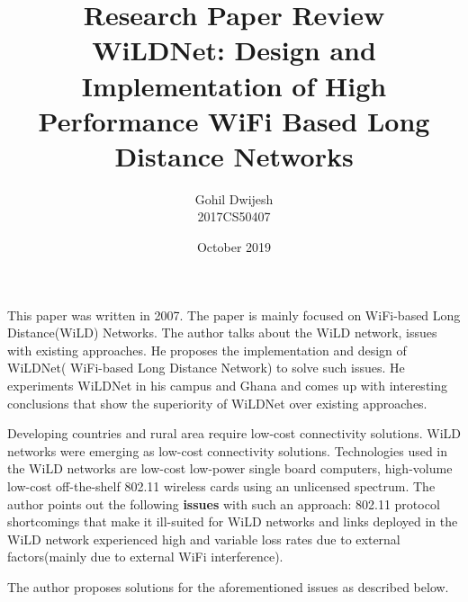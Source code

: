 \documentclass{article}
\title{Research Paper Review\\ WiLDNet: Design and Implementation of High Performance WiFi Based Long Distance Networks}
\author{Gohil Dwijesh \\ 2017CS50407}
\date{October 2019}
\begin{document}
\maketitle
\par This paper was written in 2007. The paper is mainly focused on WiFi-based Long Distance(WiLD) Networks. The author talks about the WiLD network, issues with existing approaches. He proposes the implementation and design of WiLDNet( WiFi-based Long Distance Network) to solve such issues. He experiments WiLDNet in his campus and Ghana and comes up with interesting conclusions that show the superiority of WiLDNet over existing approaches.
\par Developing countries and rural area require low-cost connectivity solutions. WiLD networks were emerging as low-cost connectivity solutions. Technologies used in the WiLD networks are low-cost low-power single board computers, high-volume low-cost off-the-shelf 802.11 wireless cards using an unlicensed spectrum. The author points out the following \textbf{issues} with such an approach: 802.11 protocol shortcomings that make it ill-suited for WiLD networks and links deployed in the WiLD network experienced high and variable loss rates due to external factors(mainly due to external WiFi interference).
\par The author proposes solutions for the aforementioned issues as described below.
\end{document}
